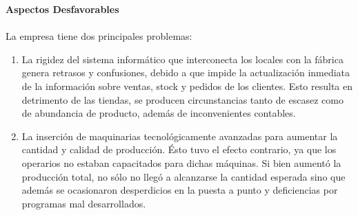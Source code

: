 \documentclass[a4paper,10pt,titlepage]{article}
\begin{document}
		
		\textbf {Aspectos Desfavorables}\\\\
		\indent La empresa tiene dos principales problemas:
		\begin {enumerate}
		 \item La rigidez del sistema inform\'{a}tico que interconecta los locales con la f\'{a}brica genera retrasos y confusiones, debido a que impide la actualizaci\'{o}n inmediata de la informaci\'{o}n sobre ventas, stock y pedidos de los clientes. Esto resulta en detrimento de las tiendas, se producen circunstancias tanto de escasez como de abundancia de producto, adem\'{a}s de inconvenientes contables.
		 \item La inserci\'on de maquinarias tecnol\'ogicamente avanzadas para aumentar la cantidad y calidad de producci\'on. \'Esto tuvo el efecto contrario, ya que los operarios no estaban capacitados para dichas m\'aquinas. Si bien aument\'{o} la producci\'{o}n total, no s\'{o}lo no lleg\'{o} a alcanzarse la cantidad esperada sino que adem\'{a}s se ocasionaron desperdicios en la puesta a punto y deficiencias por programas mal desarrollados.\\
		\end {enumerate}

	\vspace{0.5cm}
\end{document}
